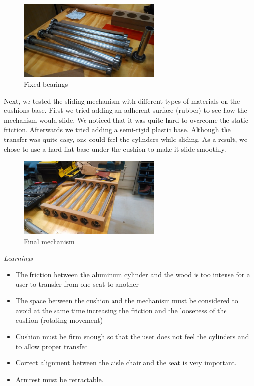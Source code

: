 \begin{figure}[h]
\centering
\includegraphics[width=7cm]{brazil_images/image041.jpg}
\caption{Fixed bearings}
\label{fig:fixed}
\end{figure}

Next, we tested the sliding mechanism with different types of materials on the cushions base. First we tried adding an adherent surface (rubber) to see how the mechanism would slide. We noticed that it was quite hard to overcome the static friction. Afterwards we tried adding a semi-rigid plastic base. Although the transfer was quite easy, one could feel the cylinders while sliding. As a result, we chose to use a hard flat base under the cushion to make it slide smoothly.   


\begin{figure}[h]
\centering
\includegraphics[width=7cm]{brazil_images/image042.jpg}
\caption{Final mechanism}
\label{fig:final_mechanism}
\end{figure}

\emph{Learnings}

\begin{itemize}
	\item The friction between the aluminum cylinder and the wood is too intense for a user to transfer from one seat to another
	\item The space between the cushion and the mechanism must be considered to avoid at the same time increasing the friction and the looseness of the cushion (rotating movement)
	\item Cushion must be firm enough so that the user does not feel the cylinders and to allow proper transfer
	\item Correct alignment between the aisle chair and the seat is very important.
	\item Armrest must be retractable.
\end{itemize}


